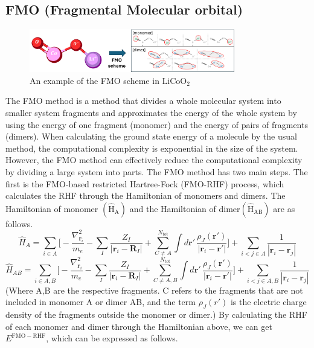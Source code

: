 \documentclass[pdflatex,sn-mathphys-num]{sn-jnl}%
\theoremstyle{thmstyleone}%
\theoremstyle{thmstyletwo}%
\theoremstyle{thmstylethree}%
\begin{document}
\subsection{FMO (Fragmental Molecular orbital)}\label{subsec2.3}
\begin{figure}[H]
\centering
\includegraphics[width=0.8\textwidth]{fig/LiCoO2_FMO.png}
\caption{An example of the FMO scheme in \(\mathrm{LiCoO_2}\)}\label{Fig.4}
\end{figure}
The FMO method is a method that divides a whole molecular system into smaller system fragments and approximates the energy of the whole system by using the energy of one fragment (monomer) and the energy of pairs of fragments (dimers). When calculating the ground state energy of a molecule by the usual method, the computational complexity is exponential in the size of the system. However, the FMO method can effectively reduce the computational complexity by dividing a large system into parts. 
The FMO method has two main steps. The first is the FMO-based restricted Hartree-Fock (FMO-RHF) process, which calculates the RHF through the Hamiltonian of monomers and dimers. The Hamiltonian of monomer \(\mathrm{(\hat{H}_{A})}\) and the Hamiltonian of dimer\(\mathrm{(\hat{H}_{AB})}\) are as follows. 
\begin{equation}
\hat{H}_A = 
\sum_{i \in A} \Bigg[
    -\frac{\nabla_{\mathbf{r}_i}^2}{m_e}
    - \sum_I \frac{Z_I}{|\mathbf{r}_i - \mathbf{R}_I|}
    + \sum_{C \neq A}^{N_{\mathrm{tot}}} 
      \int d\mathbf{r}' \, \frac{\rho_J(\mathbf{r}')}{|\mathbf{r}_i - \mathbf{r}'|}
\Bigg]
+ \sum_{i<j \in A} \frac{1}{|\mathbf{r}_i - \mathbf{r}_j|}\label{eq5}
\end{equation}
\begin{equation}
\hat{H}_{AB} = 
\sum_{i \in A,B} \Bigg[
    -\frac{\nabla_{\mathbf{r}_i}^2}{m_e}
    - \sum_I \frac{Z_I}{|\mathbf{r}_i - \mathbf{R}_I|}
    + \sum_{C \neq A,B}^{N_{\mathrm{tot}}} 
      \int d\mathbf{r}' \, \frac{\rho_J(\mathbf{r}')}{|\mathbf{r}_i - \mathbf{r}'|}
\Bigg] + \sum_{i<j \in A,B} \frac{1}{|\mathbf{r}_i - \mathbf{r}_j|}
\end{equation}
(Where A,B are the respective fragments. C refers to the fragments that are not included in monomer A or dimer AB, and the term \(\rho_J(r')\) is the electric charge density of the fragments outside the monomer or dimer.) By calculating the RHF of each monomer and dimer through the Hamiltonian above, we can get \({E^\mathrm{FMO-RHF}}\), which can be expressed as follows.
\end{document}
